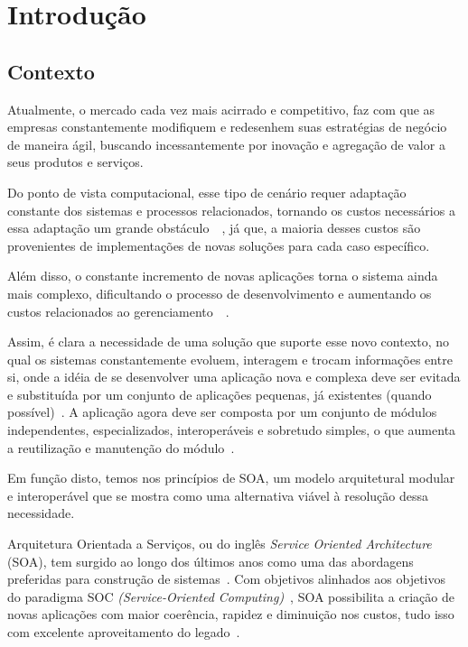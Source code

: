 \chapter{Introdução}
\label{ch:1}

\section{Contexto}
Atualmente, o mercado cada vez mais acirrado e competitivo, faz com que as empresas constantemente modifiquem e redesenhem suas estratégias de negócio de maneira ágil, buscando incessantemente por inovação e agregação de valor a seus produtos e serviços. 

Do ponto de vista computacional, esse tipo de cenário requer adaptação constante dos sistemas e processos relacionados, tornando os custos necessários a essa adaptação um grande obstáculo~\cite{papazoglou2008service}~\cite{rabelo2006}, já que, a maioria desses custos são provenientes de implementações de novas soluções para cada caso específico. 

Além disso, o constante incremento de novas aplicações torna o sistema ainda mais complexo, dificultando o processo de desenvolvimento e aumentando os custos relacionados ao gerenciamento~\cite{rabelo2006}~\cite{ada2006}.

Assim, é clara a necessidade de uma solução que suporte esse novo contexto, no qual os sistemas constantemente evoluem, interagem e trocam informações entre si, onde a idéia de se desenvolver uma aplicação nova e complexa deve ser evitada e substituída por um conjunto de aplicações pequenas, já existentes (quando possível)~\cite{rabelo2006}. A aplicação agora deve ser composta por um conjunto de módulos independentes, especializados, interoperáveis e sobretudo simples, o que aumenta a reutilização e manutenção do módulo~\cite{oracle2005ws}.

Em função disto, temos nos princípios de SOA, um modelo arquitetural modular e interoperável que se mostra como uma alternativa viável à resolução dessa necessidade.

Arquitetura Orientada a Serviços, ou do inglês \textit{Service Oriented Architecture} (SOA), tem surgido ao longo dos últimos anos como uma das abordagens preferidas para construção de sistemas~\cite{erl2008soa}. Com objetivos alinhados aos objetivos do paradigma SOC \textit{(Service-Oriented Computing)}~\cite{papazoglou:2003}, SOA possibilita a criação de novas aplicações com maior coerência, rapidez e diminuição nos custos, tudo isso com excelente aproveitamento do legado~\cite{erl2008soa}.


